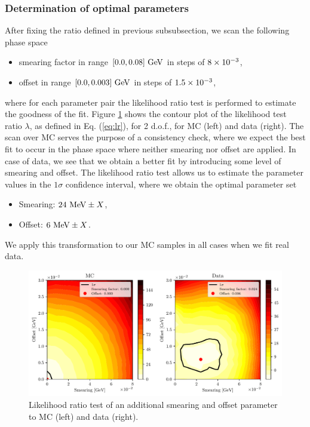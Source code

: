 \subsubsection{Determination of optimal parameters}

After fixing the ratio defined in previous subsubsection, we scan the following phase space
\begin{itemize}
\item smearing factor in range $[0.0,0.08]\mathrm{~GeV}$ in steps of $8\times 10^{-3}$,
\item offset in range $[0.0,0.003]\mathrm{~GeV}$ in steps of $1.5\times 10^{-3}$,
\end{itemize}
where for each parameter pair the likelihood ratio test is performed to estimate the goodness of the fit. Figure \ref{fig:smearing_offset} shows the contour plot of the likelihood test ratio $\lambda$, as defined in Eq. (\ref{eq:lr}), for 2 d.o.f., for MC (left) and data (right). The scan over MC serves the purpose of a consistency check, where we expect the best fit to occur in the phase space where neither smearing nor offset are applied. In case of data, we see that we obtain a better fit by introducing some level of smearing and offset. The likelihood ratio test allows us to estimate the parameter values in the $1\sigma$ confidence interval, where we obtain the optimal parameter set
\begin{itemize}
\item Smearing: $24\mathrm{~MeV} \pm X$,
\item Offset: $6\mathrm{~MeV} \pm X$.
\end{itemize}
We apply this transformation to our MC samples in all cases when we fit real data.

\begin{figure}[H]
	\centering
	\captionsetup{width=0.8\linewidth}
	\includegraphics[width=\linewidth]{fig/smearing_offset}
	\caption{Likelihood ratio test of an additional smearing and offset parameter to MC (left) and data (right).}
	\label{fig:smearing_offset}
\end{figure}

